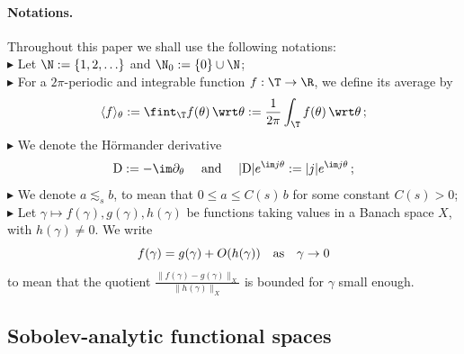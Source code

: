 \documentclass[a4paper,reqno,10pt]{article}
\newcommand{\pa}{\partial}
\begin{document}
\paragraph{\bf Notations.} Throughout this paper we shall use the following notations:
\\[1mm]
\noindent $\blacktriangleright$
Let $\N:=\{1,2,\ldots\}$ and $\N_{0}:=\{0\}\cup \N$;
\\[1mm]
\noindent $\blacktriangleright$ For a $2\pi$-periodic and integrable function $f:\T\to\R$, we define its average by
\begin{align}\label{average-f}
\langle f\rangle_\theta:=\fint_{\T} f(\theta)\,\wrt \theta := \frac{1}{2\pi}\int_{\T} f(\theta)\,\wrt \theta\,;
\end{align}
\noindent $\blacktriangleright$ We denote the H\"ormander derivative
\begin{equation}
    {\rm D}:= - \im \pa_{\theta} \quad \textnormal{ and } \quad |{\rm D}|e^{\im j \theta} := |j|e^{\im j \theta} \,;
\end{equation}
\noindent $\blacktriangleright$ We denote  $a \lesssim_{s} b$, to  mean that $0\leqslant a \le C(s)\, b$ for some constant $C(s)>0$;
\\[1mm]
\noindent $\blacktriangleright$
Let   $\gamma\mapsto f(\gamma),g(\gamma), h(\gamma)$ be functions taking values in a Banach space $X$, with $h(\gamma)\neq 0$. We write  $$f(\gamma)=g(\gamma)+O(h(\gamma)) \quad \textnormal{as}\quad  \gamma\to 0
$$
to  mean that the quotient 
$
\frac{\|f(\gamma)-g(\gamma)\|_{X}}{\|h(\gamma)\|_{X}}
$
 is bounded for $\gamma$ small enough.

\subsection{Sobolev-analytic functional spaces}
\end{document}
